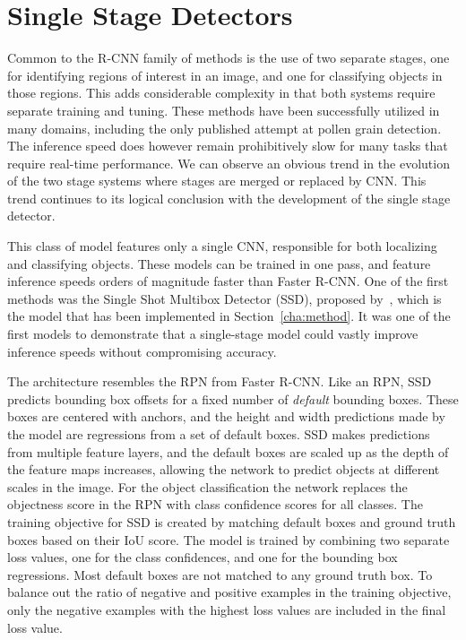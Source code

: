\section{Single Stage Detectors}\label{sec:ssd}
Common to the R-CNN family of methods is the use of two separate stages, one for identifying regions of interest in an image, and one for classifying objects in those regions.
This adds considerable complexity in that both systems require separate training and tuning.
These methods have been successfully utilized in many domains, including the only published attempt at pollen grain detection.
The inference speed does however remain prohibitively slow for many tasks that require real-time performance.
We can observe an obvious trend in the evolution of the two stage systems where stages are merged or replaced by CNN\@.
This trend continues to its logical conclusion with the development of the single stage detector.

This class of model features only a single CNN, responsible for both localizing and classifying objects.
These models can be trained in one pass, and feature inference speeds orders of magnitude faster than Faster R-CNN\@.
One of the first methods was the Single Shot Multibox Detector (SSD), proposed by\ \cite{liu_ssd_2016}, which is the model that has been implemented in Section~\ref{cha:method}.
It was one of the first models to demonstrate that a single-stage model could vastly improve inference speeds without compromising accuracy. 

The architecture resembles the RPN from Faster R-CNN\@.
Like an RPN, SSD predicts bounding box offsets for a fixed number of \textit{default} bounding boxes.
These boxes are centered with anchors, and the height and width predictions made by the model are regressions from a set of default boxes.
SSD makes predictions from multiple feature layers, and the default boxes are scaled up as the depth of the feature maps increases, allowing the network to predict objects at different scales in the image.
For the object classification the network replaces the objectness score in the RPN with class confidence scores for all classes.
The training objective for SSD is created by matching default boxes and ground truth boxes based on their IoU score.
The model is trained by combining two separate loss values, one for the class confidences, and one for the bounding box regressions.
Most default boxes are not matched to any ground truth box.
To balance out the ratio of negative and positive examples in the training objective, only the negative examples with the highest loss values are included in the final loss value.

